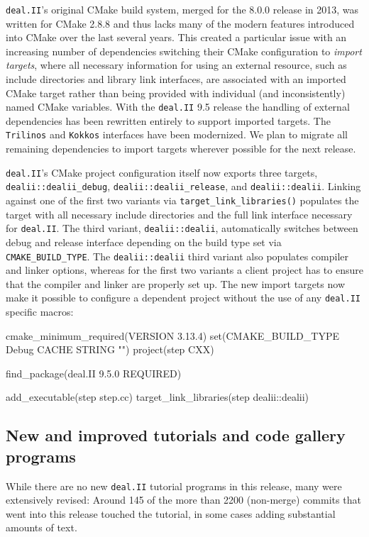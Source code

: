 \documentclass{ansarticle-preprint}
\newcommand{\specialword}[1]{\texttt{#1}}
\newcommand{\dealii}{{\specialword{deal.II}}\xspace}
\newcommand{\trilinos}{{\specialword{Trilinos}}\xspace}
\newcommand{\kokkos}{{\specialword{Kokkos}}\xspace}
\begin{document}
\dealii's original CMake build system, merged for the 8.0.0 release
in 2013, was written for CMake 2.8.8 and thus lacks many of the
modern features introduced into CMake over the last several years. This
created a particular issue with an increasing number of dependencies
switching their CMake configuration to \emph{import targets}, where all
necessary information for using an external resource, such as include
directories and library link interfaces, are associated with an imported
CMake target rather than being provided with individual (and
inconsistently) named CMake variables. With the \dealii 9.5 release the
handling of external dependencies has been rewritten entirely to support
imported targets. The \trilinos and \kokkos interfaces have been
modernized. We plan to migrate all remaining dependencies to import targets
wherever possible for the next release.

\dealii's CMake project configuration itself now exports three targets,
\texttt{dealii::dealii\_debug}, \texttt{dealii::dealii\_release}, and
\texttt{dealii::dealii}. Linking against one of the first two variants via
\texttt{target\_link\_libraries()} populates the target with all necessary
include directories and the full link interface necessary for \dealii. The
third variant, \texttt{dealii::dealii}, automatically switches between
debug and release interface depending on the build type set via
\texttt{CMAKE\_BUILD\_TYPE}. The \texttt{dealii::dealii} third variant also
populates compiler and linker options, whereas for the first two variants a
client project has to ensure that the compiler and linker are properly set
up. The new import targets now make it possible to configure a dependent
project without the use of any \dealii specific macros:
%
\begin{anycode}
cmake_minimum_required(VERSION 3.13.4)
set(CMAKE_BUILD_TYPE Debug CACHE STRING "")
project(step CXX)

find_package(deal.II 9.5.0 REQUIRED)

add_executable(step step.cc)
target_link_libraries(step dealii::dealii)
\end{anycode}


\subsection{New and improved tutorials and code gallery programs}
\label{subsec:steps}

While there are no new \dealii tutorial programs in this release, many
were extensively revised: Around 145 of the more than 2200 (non-merge)
commits that went into this release touched the tutorial, in some
cases adding substantial amounts of text.
\end{document}
